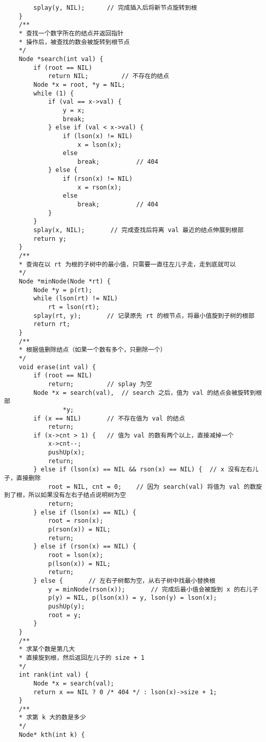 \begin{verbatim}
        splay(y, NIL);      // 完成插入后将新节点旋转到根 
    }
    /**
    * 查找一个数字所在的结点并返回指针 
    * 操作后，被查找的数会被旋转到根节点 
    */
    Node *search(int val) {
        if (root == NIL)
            return NIL;         // 不存在的结点 
        Node *x = root, *y = NIL;
        while (1) {
            if (val == x->val) {
                y = x;
                break;
            } else if (val < x->val) {
                if (lson(x) != NIL)
                    x = lson(x);
                else
                    break;          // 404
            } else {
                if (rson(x) != NIL)
                    x = rson(x);
                else
                    break;          // 404
            }
        }
        splay(x, NIL);       // 完成查找后将离 val 最近的结点伸展到根部
        return y; 
    }
    /**
    * 查询在以 rt 为根的子树中的最小值，只需要一直往左儿子走，走到底就可以 
    */
    Node *minNode(Node *rt) {
        Node *y = p(rt);
        while (lson(rt) != NIL)
            rt = lson(rt);
        splay(rt, y);       // 记录原先 rt 的根节点，将最小值旋到子树的根部 
        return rt;
    }
    /**
    * 根据值删除结点（如果一个数有多个，只删除一个） 
    */
    void erase(int val) {
        if (root == NIL)
            return;         // splay 为空 
        Node *x = search(val),  // search 之后，值为 val 的结点会被旋转到根部 
                *y;
        if (x == NIL)       // 不存在值为 val 的结点 
            return; 
        if (x->cnt > 1) {   // 值为 val 的数有两个以上，直接减掉一个 
            x->cnt--;
            pushUp(x);
            return; 
        } else if (lson(x) == NIL && rson(x) == NIL) {  // x 没有左右儿子，直接删除 
            root = NIL, cnt = 0;    // 因为 search(val) 将值为 val 的数旋到了根，所以如果没有左右子结点说明树为空 
            return;
        } else if (lson(x) == NIL) {
            root = rson(x);
            p(rson(x)) = NIL;
            return;
        } else if (rson(x) == NIL) {
            root = lson(x);
            p(lson(x)) = NIL;
            return;
        } else {       // 左右子树都为空，从右子树中找最小替换根 
            y = minNode(rson(x));       // 完成后最小值会被旋到 x 的右儿子 
            p(y) = NIL, p(lson(x)) = y, lson(y) = lson(x);
            pushUp(y);
            root = y;
        }
    }
    /**
    * 求某个数是第几大 
    * 直接旋到根，然后返回左儿子的 size + 1 
    */
    int rank(int val) {
        Node *x = search(val);
        return x == NIL ? 0 /* 404 */ : lson(x)->size + 1;
    }
    /**
    * 求第 k 大的数是多少 
    */
    Node* kth(int k) {

\end{verbatim}
